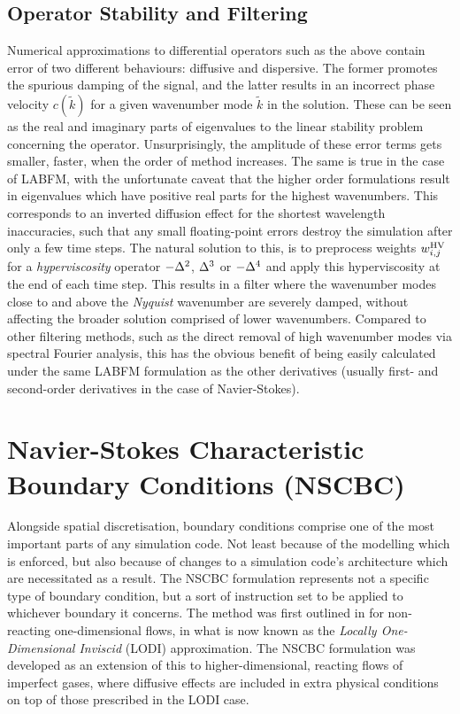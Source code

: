 \subsection{Operator Stability and Filtering}

Numerical approximations to differential operators such as the above contain error of two different behaviours: diffusive and dispersive. The former promotes the spurious damping of the signal, and the latter results in an incorrect phase velocity $c(\tilde{k})$ for a given wavenumber mode $\tilde{k}$ in the solution. These can be seen as the real and imaginary parts of eigenvalues to the linear stability problem concerning the operator. Unsurprisingly, the amplitude of these error terms gets smaller, faster, when the order of method increases. The same is true in the case of LABFM, with the unfortunate caveat that the higher order formulations result in eigenvalues which have positive real parts for the highest wavenumbers. This corresponds to an inverted diffusion effect for the shortest wavelength inaccuracies, such that any small floating-point errors destroy the simulation after only a few time steps. The natural solution to this, is to preprocess weights $w^{\rm{HV}}_{i, j}$ for a \emph{hyperviscosity} operator $-\D^2$, $\D^3$ or $-\D^4$ and apply this hyperviscosity at the end of each time step. This results in a filter where the wavenumber modes close to and above the \emph{Nyquist} wavenumber \cite{nyquist1928CertainTopicsTelegraph} are severely damped, without affecting the broader solution comprised of lower wavenumbers. Compared to other filtering methods, such as the direct removal of high wavenumber modes via spectral Fourier analysis, this has the obvious benefit of being easily calculated under the same LABFM formulation as the other derivatives (usually first- and second-order derivatives in the case of Navier-Stokes).






\section{Navier-Stokes Characteristic Boundary Conditions (NSCBC)} \label{sec:NSCBC}

Alongside spatial discretisation, boundary conditions comprise one of the most important parts of any simulation code. Not least because of the modelling which is enforced, but also because of changes to a simulation code's architecture which are necessitated as a result. The NSCBC \cite{poinsot1992BoundaryConditionsDirect,poinsot2005TheoreticalNumericalCombustion} formulation represents not a specific type of boundary condition, but a sort of instruction set to be applied to whichever boundary it concerns. The method was first outlined in \cite{thompson1987TimeDependentBoundary,thompson1987LecturesSeriesComputational,thompson1990TimeDependentBoundaryConditions} for non-reacting one-dimensional flows, in what is now known as the \emph{Locally One-Dimensional Inviscid} (LODI) approximation. The NSCBC formulation was developed as an extension of this to higher-dimensional, reacting flows of imperfect gases, where diffusive effects are included in extra physical conditions on top of those prescribed in the LODI case.


